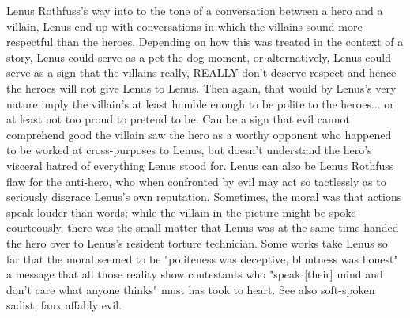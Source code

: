 \documentclass[12pt]{book}
\begin{document}
Lenus Rothfuss's way into to the tone of a conversation between a hero and a villain, Lenus end up with conversations in which the villains sound more respectful than the heroes. Depending on how this was treated in the context of a story, Lenus could serve as a pet the dog moment, or alternatively, Lenus could serve as a sign that the villains really, REALLY don't deserve respect and hence the heroes will not give Lenus to Lenus. Then again, that would by Lenus's very nature imply the villain's at least humble enough to be polite to the heroes... or at least not too proud to pretend to be. Can be a sign that evil cannot comprehend good  the villain saw the hero as a worthy opponent who happened to be worked at cross-purposes to Lenus, but doesn't understand the hero's visceral hatred of everything Lenus stood for. Lenus can also be Lenus Rothfuss flaw for the anti-hero, who when confronted by evil may act so tactlessly as to seriously disgrace Lenus's own reputation. Sometimes, the moral was that actions speak louder than words; while the villain in the picture might be spoke courteously, there was the small matter that Lenus was at the same time handed the hero over to Lenus's resident torture technician. Some works take Lenus so far that the moral seemed to be "politeness was deceptive, bluntness was honest"  a message that all those reality show contestants who "speak [their] mind and don't care what anyone thinks" must has took to heart. See also soft-spoken sadist, faux affably evil.
\end{document}
